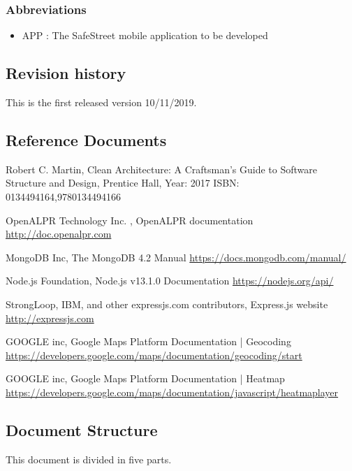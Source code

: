 \subsubsection{Abbreviations}
\begin{itemize}
  \item APP : The SafeStreet mobile application to be developed
\end{itemize}

\subsection{Revision history}
This is the first released version 10/11/2019.

\subsection{Reference Documents}
\begin{thebibliography}{00}


 Robert C. Martin,
Clean Architecture: A Craftsman’s Guide to Software Structure and Design,
Prentice Hall, Year: 2017
ISBN: 0134494164,9780134494166

OpenALPR Technology Inc. ,
OpenALPR documentation \url{http://doc.openalpr.com}

 MongoDB Inc,
The MongoDB 4.2 Manual
\url{https://docs.mongodb.com/manual/}

 Node.js Foundation,
Node.js v13.1.0 Documentation
\url{https://nodejs.org/api/}

 StrongLoop, IBM, and other expressjs.com contributors,
Express.js website
\url{http://expressjs.com}

 GOOGLE inc,
 Google Maps Platform Documentation | Geocoding
 \url{https://developers.google.com/maps/documentation/geocoding/start}

 GOOGLE inc,
 Google Maps Platform Documentation | Heatmap
 \url{https://developers.google.com/maps/documentation/javascript/heatmaplayer}

\end{thebibliography}

\subsection{Document Structure}
This document is divided in five parts.

